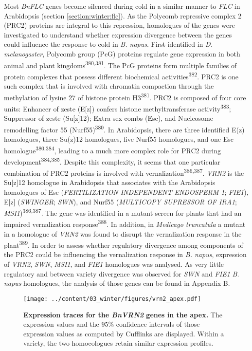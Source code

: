 \documentclass[12pt,]{book}
\begin{document}
Most \emph{BnFLC} genes become silenced during cold in a similar manner
to \emph{FLC} in Arabidopsis (section \ref{section:winter:flc}). As the
Polycomb repressive complex 2 (PRC2) proteins are integral to this
repression, homologues of the genes were investigated to understand
whether expression divergence between the genes could influence the
response to cold in \emph{B. napus}. First identified in \emph{D.
melanogaster}, Polycomb group (PcG) proteins regulate gene expression in
both animal and plant kingdoms\textsuperscript{380,381}. The PcG
proteins form multiple families of protein complexes that possess
different biochemical activities\textsuperscript{382}. PRC2 is one such
complex that is involved with chromatin compaction through the
methylation of lysine 27 of histone protein H3\textsuperscript{381}.
PRC2 is composed of four core units: Enhancer of zeste (E{[}z{]})
confers histone methyltransferase activity\textsuperscript{383};
Suppressor of zeste (Su{[}z{]}12); Extra sex combs (Esc), and Nucleosome
remodelling factor 55 (Nurf55)\textsuperscript{380}. In Arabidopsis,
there are three identified E(z) homologues, three Su(z)12 homologues,
five Nurf55 homologues, and one Esc homologue\textsuperscript{380,384},
leading to a much more complex role for PRC2 during
development\textsuperscript{384,385}. Despite this complexity, it seems
that one particular combination of PRC2 proteins is involved with
vernalization\textsuperscript{386,387}. \emph{VRN2} is the Su{[}z{]}12
homologue in Arabidopsis that associates with the Arabidopsis homologues
of Esc (\emph{FERTILIZATION INDEPENDENT ENDOSPERM 1}; \emph{FIE1}),
E{[}z{]} (\emph{SWINGER}; \emph{SWN}), and Nurf55 (\emph{MULTICOPY
SUPRESSOR OF IRA1}; \emph{MSI1})\textsuperscript{386,387}. The gene was
identified in a mutant screen for plants that had an impaired
vernalization response\textsuperscript{388}. In addition, in
\emph{Medicago truncatula} a mutant in a homologue of \emph{VRN2} was
found to disrupt the vernalization response in the
plant\textsuperscript{389}. In order to assess whether regulatory
divergence among components of the PRC2 could be influencing the
vernalization response in \emph{B. napus}, expression of \emph{VRN2},
\emph{SWN}, \emph{MSI1}, and \emph{FIE1} homologues was analysed. As
very little regulatory and between variety divergence was observed for
\emph{SWN} and \emph{FIE1} \emph{B. napus} homologues, the analysis of
those genes can be found in Appendix B.

\begin{figure}[htbp]
\centering
\texttt{[image: ../content/03\_winter/figures/vrn2\_apex.pdf]}
\caption{\textbf{Expression traces for the \emph{BnVRN2} genes in the
apex.} The expression values and the 95\% confidence intervals of those
expression values as computed by Cufflinks are displayed. Within a
variety, the two homoeologues retain similar expression
profiles.}\label{figure:3xx:vrn2apex}
\end{figure}
\end{document}
